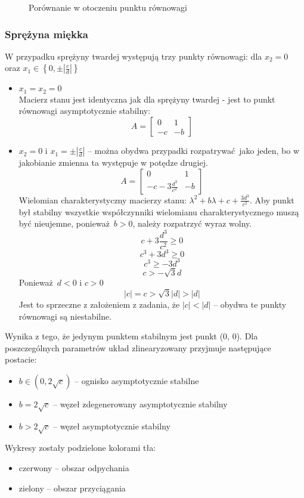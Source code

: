\documentclass[a4paper, 10pt]{article}
\begin{document}
				
				\begin{figure}[H]
					\centering
					\def \svgwidth{0.8\columnwidth}
					
					\caption{Porównanie w otoczeniu punktu równowagi}
				\end{figure}\newpage
				
				
			\subsubsection{Sprężyna miękka}
				W przypadku sprężyny twardej występują trzy punkty równowagi: dla $x_2 = 0$ oraz $x_1 \in \left\{0, \pm \left| \frac{c}{d}\right|\right\}$
				\begin{itemize}
					\item[] $x_1 = x_2 = 0$ \\
						Macierz stanu jest identyczna jak dla sprężyny twardej - jest to punkt równowagi asymptotycznie stabilny:
						$$
							A = \begin{bmatrix}
								0 & 1 \\
								-c  & -b
							\end{bmatrix}
						$$
					\item[] $x_2 = 0$ i $x_1 = \pm \left| \frac{c}{d}\right|$ -- można obydwa przypadki rozpatrywać jako jeden, bo w jakobianie zmienna ta występuje w potędze drugiej.
						$$
							A = \begin{bmatrix}
								0 & 1 \\
								-c - 3\frac{d^3}{c^2} & -b
							\end{bmatrix}
						$$
					Wielomian charakterystyczny macierzy stanu: $\lambda^2 + b\lambda + c + \frac{3 d^3}{c^2}$. Aby punkt był stabilny wszystkie współczynniki wielomianu charakterystycznego muszą być nieujemne, ponieważ $b>0$, należy rozpatrzyć wyraz wolny.
					$$
						 c + 3\frac{d^3}{c^2} \geq 0
					$$
					$$
						c^3 + 3d^3 \geq 0
					$$
					$$
						c^3 \geq -3d^3
					$$
					$$
						c > -\sqrt{3}d
					$$
					Ponieważ $d < 0$ i $c > 0$
					$$
						|c| = c > \sqrt{3} |d| > |d|
					$$
					Jest to sprzeczne z założeniem z zadania, że $|c| < |d|$ -- obydwa te punkty równowagi są niestabilne.
				\end{itemize}
				Wynika z tego, że jedynym punktem stabilnym jest punkt (0, 0). Dla poszczególnych parametrów układ zlinearyzowany przyjmuje następujące postacie:
				\begin{itemize}
					\item[] $b \in (0, 2\sqrt{c}) $ -- ognisko asymptotycznie stabilne
					\item[] $b = 2 \sqrt{c}$ -- węzeł zdegenerowany asymptotycznie stabilny
					\item[]	$b > 2\sqrt{c}$ -- węzeł asymptotycznie stabilny
				\end{itemize}
				Wykresy zostały podzielone kolorami tła:
				\begin{itemize}
					\item[] czerwony -- obszar odpychania
					\item[] zielony -- obszar przyciągania
				\end{itemize}
\end{document}
